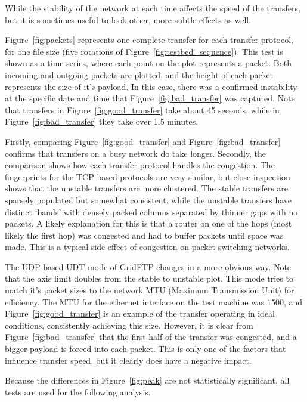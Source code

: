 \documentclass{sig-alternate-05-2015}
\begin{document}
While the stability of the network at each time affects the speed of the transfers, but it is sometimes useful to look other, more subtle effects as well. 

Figure~\ref{fig:packets} represents  one complete transfer for each transfer protocol, for one file size (five rotations of Figure~\ref{fig:testbed_sequence}). This test is shown as a time series, where each point on the plot represents a packet. Both incoming and outgoing packets are plotted, and the height of each packet represents the size of it's payload. In this case, there was a confirmed instability at the specific date and time that Figure~\ref{fig:bad_transfer} was captured. Note that transfers in Figure~\ref{fig:good_transfer} take about 45 seconds, while in Figure~\ref{fig:bad_transfer} they take over 1.5 minutes.

Firstly, comparing Figure~\ref{fig:good_transfer} and Figure~\ref{fig:bad_transfer} confirms that transfers on a busy network do take longer. Secondly, the comparison shows how each transfer protocol handles the congestion. The fingerprints for the TCP based protocols are very similar, but close inspection shows that the unstable transfers are more clustered. The stable transfers are sparsely populated but somewhat consistent, while the unstable transfers have distinct `bands' with densely packed columns separated by thinner gaps with no packets. A likely explanation for this is that a router on one of the hops (most likely the first hop) was congested and had to buffer packets until space was made. This is a typical side effect of congestion on packet switching networks.

The UDP-based UDT mode of GridFTP changes in a more obvious way. Note that the axis limit doubles from the stable to unstable plot. This mode tries to match it's packet sizes to the network MTU (Maximum Transmission Unit) for efficiency. The MTU for the ethernet interface on the test machine was 1500, and Figure~\ref{fig:good_transfer} is an example of the transfer operating in ideal conditions, consistently achieving this size. However, it is clear from Figure~\ref{fig:bad_transfer} that the first half of the transfer was congested, and a bigger payload is forced into each packet. This is only one of the factors that influence transfer speed, but it clearly does have a negative impact.

Because the differences in Figure~\ref{fig:peak} are not statistically significant, all tests are used for the following analysis.
\end{document}

